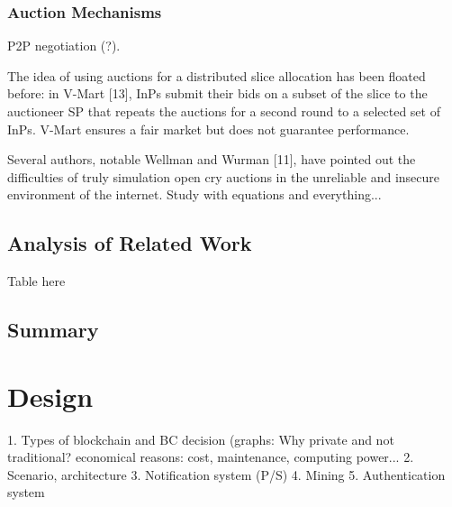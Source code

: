 \subsection{Auction Mechanisms}

P2P negotiation (?).

The idea of using auctions for a distributed slice allocation has been
floated before: in V-Mart [13], InPs submit their bids on
a subset of the slice to the auctioneer SP that repeats the
auctions for a second round to a selected set of InPs. V-Mart
ensures a fair market but does not guarantee performance.


Several authors, notable Wellman and Wurman [11], have pointed out the difficulties of truly simulation open cry auctions in the unreliable and insecure environment of the internet.
Study \citep{ausubel2006lovely} with equations and everything...


\section{Analysis of Related Work}

Table here 



\section{Summary}



\chapter{Design}
\label{ch:design}


1. Types of blockchain and BC decision (graphs: Why private and not traditional? economical reasons: cost, maintenance, computing power...
2. Scenario, architecture
3. Notification system (P/S)
4. Mining
5. Authentication system

